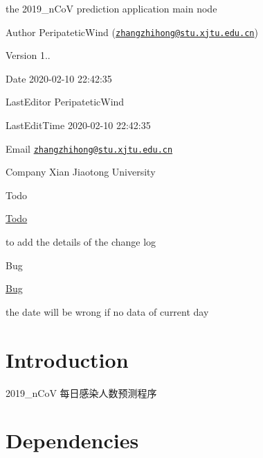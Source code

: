 the 2019\+\_\+n\+CoV prediction application main node \begin{DoxyAuthor}{Author}
Peripatetic\+Wind (\href{mailto:zhangzhihong@stu.xjtu.edu.cn}{\tt zhangzhihong@stu.\+xjtu.\+edu.\+cn}) 
\end{DoxyAuthor}
\begin{DoxyVersion}{Version}
1.. 
\end{DoxyVersion}
\begin{DoxyDate}{Date}
2020-\/02-\/10 22\+:42\+:35 
\end{DoxyDate}
\begin{DoxyParagraph}{Last\+Editor}
Peripatetic\+Wind 
\end{DoxyParagraph}
\begin{DoxyParagraph}{Last\+Edit\+Time}
2020-\/02-\/10 22\+:42\+:35 
\end{DoxyParagraph}
\begin{DoxyParagraph}{Email}
\href{mailto:zhangzhihong@stu.xjtu.edu.cn}{\tt zhangzhihong@stu.\+xjtu.\+edu.\+cn} 
\end{DoxyParagraph}
\begin{DoxyParagraph}{Company}
Xi\textquotesingle{}an Jiaotong University 
\end{DoxyParagraph}
\begin{DoxyRefDesc}{Todo}
\item[\hyperlink{todo__todo000001}{Todo}]
\begin{DoxyEnumerate}
\item to add the details of the change log 
\end{DoxyEnumerate}\end{DoxyRefDesc}
\begin{DoxyRefDesc}{Bug}
\item[\hyperlink{bug__bug000001}{Bug}]
\begin{DoxyEnumerate}
\item the date will be wrong if no data of current day 
\end{DoxyEnumerate}\end{DoxyRefDesc}
\hypertarget{index_introduction_ection}{}\section{Introduction}\label{index_introduction_ection}
2019\+\_\+n\+CoV 每日感染人数预测程序 \hypertarget{index_dependencies_section}{}\section{Dependencies}\label{index_dependencies_section}

